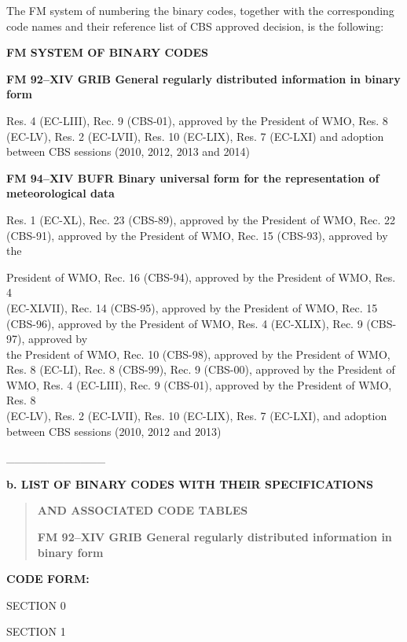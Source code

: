 The FM system of numbering the binary codes, together with the corresponding code names and their reference list of CBS approved decision, is the following:

\textbf{FM SYSTEM OF BINARY CODES}

\textbf{FM 92--XIV GRIB General regularly distributed information in binary form}

Res. 4 (EC-LIII), Rec. 9 (CBS-01), approved by the President of WMO, Res. 8\\
(EC-LV), Res. 2 (EC-LVII), Res. 10 (EC-LIX), Res. 7 (EC-LXI) and adoption\\
between CBS sessions (2010, 2012, 2013 and 2014)

\textbf{FM 94--XIV BUFR Binary universal form for the representation of meteorological data}

Res. 1 (EC-XL), Rec. 23 (CBS-89), approved by the President of WMO, Rec. 22\\
(CBS-91), approved by the President of WMO, Rec. 15 (CBS-93), approved by the

President of WMO, Rec. 16 (CBS-94), approved by the President of WMO, Res. 4\\
(EC-XLVII), Rec. 14 (CBS-95), approved by the President of WMO, Rec. 15 (CBS-96), approved by the President of WMO, Res. 4 (EC-XLIX), Rec. 9 (CBS-97), approved by\\
the President of WMO, Rec. 10 (CBS-98), approved by the President of WMO,\\
Res. 8 (EC-LI), Rec. 8 (CBS-99), Rec. 9 (CBS-00), approved by the President of\\
WMO, Res. 4 (EC-LIII), Rec. 9 (CBS-01), approved by the President of WMO, Res. 8\\
(EC-LV), Res. 2 (EC-LVII), Res. 10 (EC-LIX), Res. 7 (EC-LXI), and adoption\\
between CBS sessions (2010, 2012 and 2013)

\_\_\_\_\_\_\_\_\_\_\_\_

\textbf{b. LIST OF BINARY CODES WITH THEIR SPECIFICATIONS}

\begin{quote}
\textbf{AND ASSOCIATED CODE TABLES}

\textbf{FM 92--XIV GRIB General regularly distributed information in binary form}
\end{quote}

\textbf{CODE FORM:}

SECTION 0

SECTION 1

